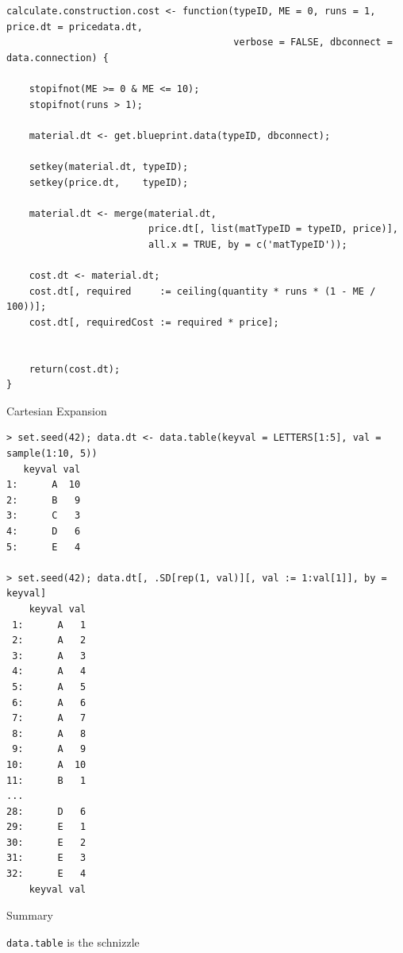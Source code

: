 \documentclass[12pt]{beamer}
\begin{document}
\begin{frame}[fragile]
\begin{verbatim}
calculate.construction.cost <- function(typeID, ME = 0, runs = 1, price.dt = pricedata.dt,
                                        verbose = FALSE, dbconnect = data.connection) {

    stopifnot(ME >= 0 & ME <= 10);
    stopifnot(runs > 1);

    material.dt <- get.blueprint.data(typeID, dbconnect);

    setkey(material.dt, typeID);
    setkey(price.dt,    typeID);

    material.dt <- merge(material.dt,
                         price.dt[, list(matTypeID = typeID, price)],
                         all.x = TRUE, by = c('matTypeID'));

    cost.dt <- material.dt;
    cost.dt[, required     := ceiling(quantity * runs * (1 - ME / 100))];
    cost.dt[, requiredCost := required * price];


    return(cost.dt);
}
\end{verbatim}
\end{frame}


\begin{frame}[fragile]{Cartesian Expansion}
\begin{verbatim}
> set.seed(42); data.dt <- data.table(keyval = LETTERS[1:5], val = sample(1:10, 5))
   keyval val
1:      A  10
2:      B   9
3:      C   3
4:      D   6
5:      E   4

> set.seed(42); data.dt[, .SD[rep(1, val)][, val := 1:val[1]], by = keyval]
    keyval val
 1:      A   1
 2:      A   2
 3:      A   3
 4:      A   4
 5:      A   5
 6:      A   6
 7:      A   7
 8:      A   8
 9:      A   9
10:      A  10
11:      B   1
...
28:      D   6
29:      E   1
30:      E   2
31:      E   3
32:      E   4
    keyval val
\end{verbatim}
\end{frame}


\begin{frame}{Summary}

\pause
\begin{center}
\Huge
\texttt{data.table} is the schnizzle
\end{center}
\end{frame}
\end{document}
